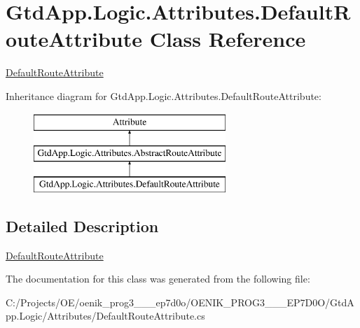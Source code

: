 \hypertarget{class_gtd_app_1_1_logic_1_1_attributes_1_1_default_route_attribute}{}\section{Gtd\+App.\+Logic.\+Attributes.\+Default\+Route\+Attribute Class Reference}
\label{class_gtd_app_1_1_logic_1_1_attributes_1_1_default_route_attribute}


\mbox{\hyperlink{class_gtd_app_1_1_logic_1_1_attributes_1_1_default_route_attribute}{Default\+Route\+Attribute}}  


Inheritance diagram for Gtd\+App.\+Logic.\+Attributes.\+Default\+Route\+Attribute\+:\begin{figure}[H]
\begin{center}
\leavevmode
\includegraphics[height=3.000000cm]{class_gtd_app_1_1_logic_1_1_attributes_1_1_default_route_attribute}
\end{center}
\end{figure}


\subsection{Detailed Description}
\mbox{\hyperlink{class_gtd_app_1_1_logic_1_1_attributes_1_1_default_route_attribute}{Default\+Route\+Attribute}} 



The documentation for this class was generated from the following file\+:\begin{DoxyCompactItemize}
\item 
C\+:/\+Projects/\+O\+E/oenik\+\_\+prog3\+\_\+\_\+\_\+ep7d0o/\+O\+E\+N\+I\+K\+\_\+\+P\+R\+O\+G3\+\_\+\_\+\_\+\+E\+P7\+D0\+O/\+Gtd\+App.\+Logic/\+Attributes/Default\+Route\+Attribute.\+cs\end{DoxyCompactItemize}
